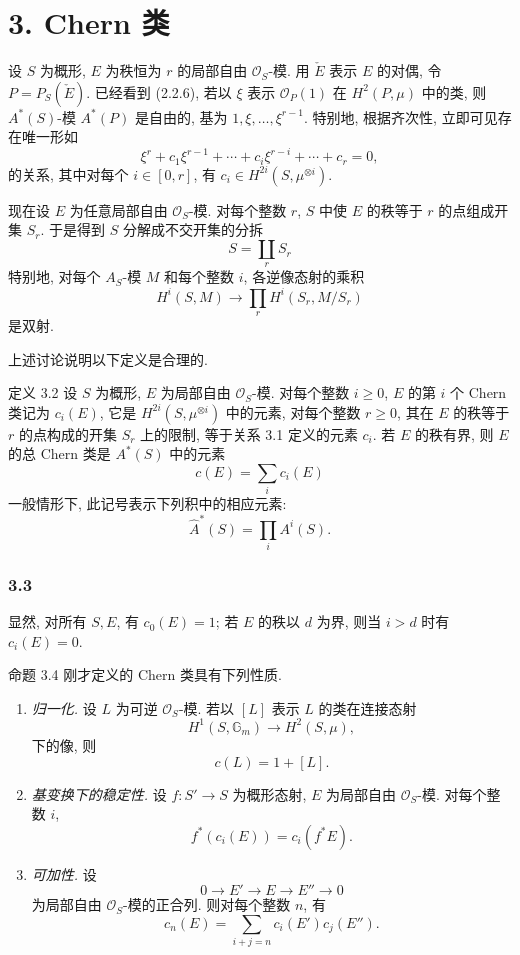 \section*{3. Chern 类}

设 $S$ 为概形, $E$ 为秩恒为 $r$ 的局部自由 $\mathcal O_S$-模. 用 $\check E$ 表示 $E$ 的对偶, 令 $P=P_S(\check E)$. 已经看到 (2.2.6), 若以 $\xi$ 表示 $\mathcal O_P(1)$ 在 $H^2(P,\mu)$ 中的类, 则 $A^*(S)$-模 $A^*(P)$ 是自由的, 基为 $1,\xi,\ldots,\xi^{r-1}$. 特别地, 根据齐次性, 立即可见存在唯一形如
\[
\xi^r+c_1\xi^{r-1}+\cdots+c_i\xi^{r-i}+\cdots+c_r=0,
\tag{3.1}
\]
的关系, 其中对每个 $i\in[0,r]$, 有 $c_i\in H^{2i}(S,\mu^{\otimes i})$.

现在设 $E$ 为任意局部自由 $\mathcal O_S$-模. 对每个整数 $r$, $S$ 中使 $E$ 的秩等于 $r$ 的点组成开集 $S_r$. 于是得到 $S$ 分解成不交开集的分拆
\[
S=\coprod_r S_r
\]
特别地, 对每个 $A_S$-模 $M$ 和每个整数 $i$, 各逆像态射的乘积
\[
H^i(S,M)\longrightarrow \prod_r H^i(S_r,M/S_r)
\]
是双射.

上述讨论说明以下定义是合理的.

\begin{statement}{定义 3.2}
设 $S$ 为概形, $E$ 为局部自由 $\mathcal O_S$-模. 对每个整数 $i\ge0$, $E$ 的第 $i$ 个 Chern 类记为 $c_i(E)$, 它是 $H^{2i}(S,\mu^{\otimes i})$ 中的元素, 对每个整数 $r\ge0$, 其在 $E$ 的秩等于 $r$ 的点构成的开集 $S_r$ 上的限制, 等于关系 3.1 定义的元素 $c_i$. 若 $E$ 的秩有界, 则 $E$ 的总 Chern 类是 $A^*(S)$ 中的元素
\[
c(E)=\sum_i c_i(E)
\]
一般情形下, 此记号表示下列积中的相应元素:
\[
\widehat A^*(S)=\prod_i A^i(S).
\]
\end{statement}

\subsubsection*{3.3}
显然, 对所有 $S,E$, 有 $c_0(E)=1$; 若 $E$ 的秩以 $d$ 为界, 则当 $i>d$ 时有 $c_i(E)=0$.

\begin{statement}{命题 3.4}
刚才定义的 Chern 类具有下列性质.
\begin{enumerate}[label=(\roman*)]
\item \emph{归一化.} 设 $L$ 为可逆 $\mathcal O_S$-模. 若以 $[L]$ 表示 $L$ 的类在连接态射
\[
H^1(S,\mathbb G_m)\longrightarrow H^2(S,\mu),
\]
下的像, 则
\[
c(L)=1+[L].
\]
\item \emph{基变换下的稳定性.} 设 $f:S'\to S$ 为概形态射, $E$ 为局部自由 $\mathcal O_S$-模. 对每个整数 $i$,
\[
f^*(c_i(E))=c_i(f^*E).
\]
\item \emph{可加性.} 设
\[
0\to E'\to E\to E''\to0
\]
为局部自由 $\mathcal O_S$-模的正合列. 则对每个整数 $n$, 有
\[
c_n(E)=\sum_{i+j=n}c_i(E')c_j(E'').
\]
\end{enumerate}
\end{statement}

